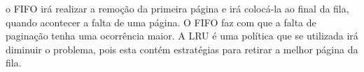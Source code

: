 \begin{question}

    o FIFO irá realizar a remoção da primeira página e irá colocá-la 
    ao final da fila, quando acontecer a falta de uma página. O FIFO faz com 
    que a falta de paginação tenha uma ocorrência maior. A LRU é uma política 
    que se utilizada irá diminuir o problema, pois esta contém estratégias 
    para retirar a melhor página da fila.

\end{question}